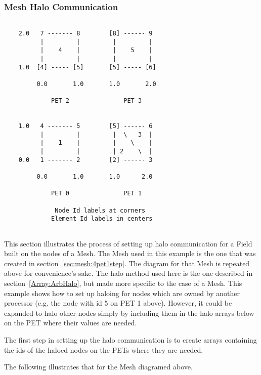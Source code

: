   \subsubsection{Mesh Halo Communication}
  \label{sec:mesh:halo}
  \begin{minipage}{\linewidth} 
  \begin{verbatim}
  
    2.0   7 ------- 8        [8] ------ 9          
          |         |         |         |
          |    4    |         |    5    |
          |         |         |         |
    1.0  [4] ----- [5]       [5] ----- [6]
          
         0.0       1.0       1.0       2.0
  
             PET 2               PET 3
  
  
    1.0   4 ------- 5        [5] ------ 6
          |         |         |  \   3  |
          |    1    |         |    \    |
          |         |         | 2    \  |
    0.0   1 ------- 2        [2] ------ 3
  
         0.0       1.0       1.0      2.0 
   
             PET 0               PET 1
  
              Node Id labels at corners
             Element Id labels in centers
  
  \end{verbatim}
  \end{minipage}
   
   This section illustrates the process of setting up halo communication for a Field built on the nodes of a Mesh.
   The Mesh used in this example is the one that was created in section~\ref{sec:mesh:4pet1step}. The diagram for 
   that Mesh is repeated above for convenience's sake. The halo method used here is the one described in 
   section~\ref{Array:ArbHalo}, but made more specific to the case of a Mesh. 
   This example shows how to set up haloing for nodes which are owned by another processor (e.g. the node with id
   5 on PET 1 above). However, it could be expanded to halo other nodes simply by including them in the 
   halo arrays below on the PET where their values are needed. 
   
   The first step in setting up the halo communication is to create arrays containing 
   the ids of the haloed nodes on the PETs where they 
   are needed. 
  
   The following illustrates that for the Mesh diagramed above. 
    
